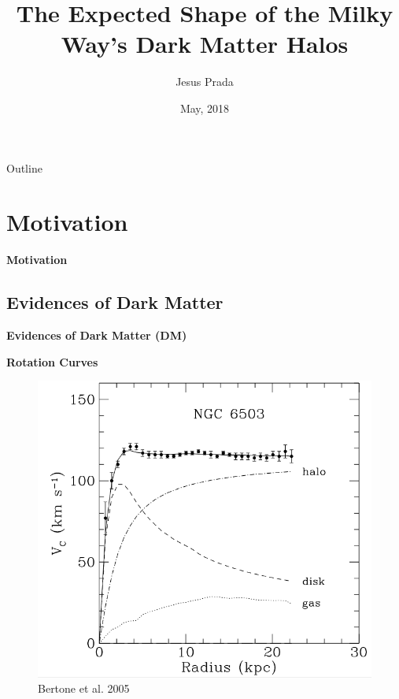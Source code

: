 \documentclass[xcolor=dvipsnames]{beamer}
\title{\textbf{The Expected Shape of the Milky Way's Dark Matter Halos }}
\author{Jesus Prada}
\institute[{\color{Black} Universidad de los Andes}] %
{
 \normalsize Advisors:\\
 PhD Jaime E. Forero-Romero \\ \small Universidad de los Andes, Departamento de Física\\
  \vspace{5mm}
 \normalsize PhD Volker Springel \\ \small  Heidelberg's Institute of Theoretical studies
}
\date{ \footnotesize May, 2018}
\begin{document}
\begin{frame}
  \titlepage
  \normalsize
\end{frame}
\begin{frame}{Outline}
 \tiny
 \tableofcontents
 \normalsize
\end{frame}
\section{Motivation}
\begin{frame}
\centering
\Huge
\textbf{Motivation}
\normalsize
\end{frame}

\subsection{Evidences of Dark Matter}
\begin{frame}
\centering
\LARGE
\textbf{Evidences of Dark Matter (DM)}
\normalsize
\end{frame}
\begin{frame}
\centering
\large
\textbf{Rotation Curves}

\begin{figure}
\includegraphics[width=0.6\linewidth]{./pics/RotationCurves.png}
\caption{\tiny Bertone et al. 2005}
\end{figure}


\end{frame}
\end{document}
